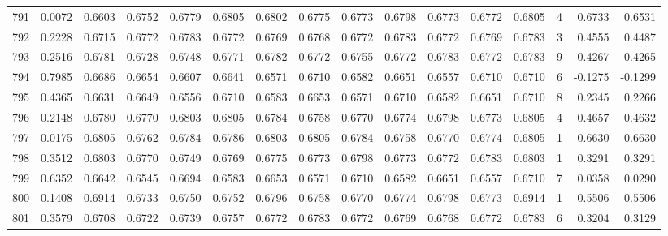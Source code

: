 \begin{tabular}{lrrrrrrrrrrrrrrr}
791 &      0.0072 &  0.6603 &  0.6752 &  0.6779 &  0.6805 &  0.6802 &  0.6775 &  0.6773 &  0.6798 &  0.6773 &   0.6772 &     0.6805 &      4 &                    0.6733 &                     0.6531 \\
792 &      0.2228 &  0.6715 &  0.6772 &  0.6783 &  0.6772 &  0.6769 &  0.6768 &  0.6772 &  0.6783 &  0.6772 &   0.6769 &     0.6783 &      3 &                    0.4555 &                     0.4487 \\
793 &      0.2516 &  0.6781 &  0.6728 &  0.6748 &  0.6771 &  0.6782 &  0.6772 &  0.6755 &  0.6772 &  0.6783 &   0.6772 &     0.6783 &      9 &                    0.4267 &                     0.4265 \\
794 &      0.7985 &  0.6686 &  0.6654 &  0.6607 &  0.6641 &  0.6571 &  0.6710 &  0.6582 &  0.6651 &  0.6557 &   0.6710 &     0.6710 &      6 &                   -0.1275 &                    -0.1299 \\
795 &      0.4365 &  0.6631 &  0.6649 &  0.6556 &  0.6710 &  0.6583 &  0.6653 &  0.6571 &  0.6710 &  0.6582 &   0.6651 &     0.6710 &      8 &                    0.2345 &                     0.2266 \\
796 &      0.2148 &  0.6780 &  0.6770 &  0.6803 &  0.6805 &  0.6784 &  0.6758 &  0.6770 &  0.6774 &  0.6798 &   0.6773 &     0.6805 &      4 &                    0.4657 &                     0.4632 \\
797 &      0.0175 &  0.6805 &  0.6762 &  0.6784 &  0.6786 &  0.6803 &  0.6805 &  0.6784 &  0.6758 &  0.6770 &   0.6774 &     0.6805 &      1 &                    0.6630 &                     0.6630 \\
798 &      0.3512 &  0.6803 &  0.6770 &  0.6749 &  0.6769 &  0.6775 &  0.6773 &  0.6798 &  0.6773 &  0.6772 &   0.6783 &     0.6803 &      1 &                    0.3291 &                     0.3291 \\
799 &      0.6352 &  0.6642 &  0.6545 &  0.6694 &  0.6583 &  0.6653 &  0.6571 &  0.6710 &  0.6582 &  0.6651 &   0.6557 &     0.6710 &      7 &                    0.0358 &                     0.0290 \\
800 &      0.1408 &  0.6914 &  0.6733 &  0.6750 &  0.6752 &  0.6796 &  0.6758 &  0.6770 &  0.6774 &  0.6798 &   0.6773 &     0.6914 &      1 &                    0.5506 &                     0.5506 \\
801 &      0.3579 &  0.6708 &  0.6722 &  0.6739 &  0.6757 &  0.6772 &  0.6783 &  0.6772 &  0.6769 &  0.6768 &   0.6772 &     0.6783 &      6 &                    0.3204 &                     0.3129 \\

\end{tabular}
